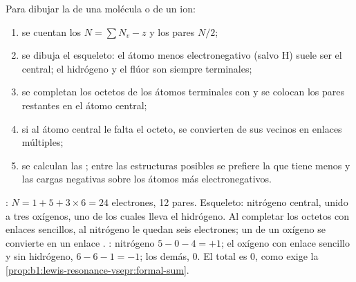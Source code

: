 \begin{method}\label{met:b1:lewis-resonance-vsepr:lewis}
Para dibujar la  de una molécula o de un ion:
\begin{enumerate}
  \item se cuentan los  $N = \sum N_v - z$ y los
        pares $N/2$;
  \item se dibuja el esqueleto: el átomo menos electronegativo (salvo H)
        suele ser el central; el hidrógeno y el flúor son siempre
        terminales;
  \item se completan los octetos de los átomos terminales con  y se colocan los pares restantes en el átomo central;
  \item si al átomo central le falta el octeto, se convierten  de sus vecinos en enlaces múltiples;
  \item se calculan las ; entre las estructuras posibles se
        prefiere la que tiene menos  y las cargas negativas
        sobre los átomos más electronegativos.
\end{enumerate}
\end{method}

\begin{example}\label{ex:b1:lewis-resonance-vsepr:hno3}
: $N = 1 + 5 + 3 \times 6 = 24$ electrones, 12 pares. Esqueleto:
nitrógeno central, unido a tres oxígenos, uno de los cuales lleva el
hidrógeno. Al completar los octetos con enlaces sencillos, al nitrógeno le
quedan seis electrones; un  de un oxígeno se convierte en
un enlace . : nitrógeno $5 - 0 - 4 = +1$; el
oxígeno con enlace sencillo y sin hidrógeno, $6 - 6 - 1 = -1$; los demás,
0. El total es 0, como exige la
\cref{prop:b1:lewis-resonance-vsepr:formal-sum}.
\end{example}

